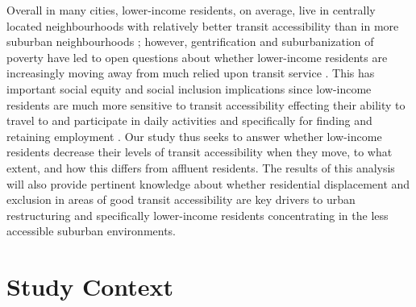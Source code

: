 Overall in many cities, lower-income residents, on average, live in centrally located neighbourhoods with relatively better transit accessibility than in more suburban neighbourhoods \cite{glaeser_why_2008,deboosere_evaluating_2018, allen_sizing_2019}; however, gentrification and suburbanization of poverty have led to open questions about whether lower-income residents are increasingly moving away from much relied upon transit service \cite{rayle_investigating_2015,zuk_gentrification_2018,delmelle_transit-induced_2021}. This has important social equity and social inclusion implications since low-income residents are much more sensitive to transit accessibility effecting their ability to travel to and participate in daily activities \cite{allen_planning_2020,barri_can_2021} and specifically for finding and retaining employment \cite{merlin_does_2017,fransen_relationship_2019,bastiaanssen_does_2021}. Our study thus seeks to answer whether low-income residents decrease their levels of transit accessibility when they move, to what extent, and how this differs from affluent residents. The results of this analysis will also provide pertinent knowledge about whether residential displacement and exclusion in areas of good transit accessibility are key drivers to urban restructuring and specifically lower-income residents concentrating in the less accessible suburban environments.



\section{Study Context}

